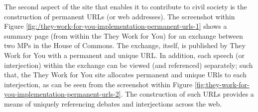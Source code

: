 The second aspect of the site that enables it to contribute to civil society is the construction of permanent URLs (or web addresses).
The screenshot within Figure \ref{fig:/they-work-for-you-implementation-permanent-urls-1} shows a summary page (from within the They Work for You) for an exchange between two MPs in the House of Commons. 
The exchange, itself, is published by They Work for You with a permanent and unique URL.
In addition, each speech (or interjection) within the exchange can be viewed (and referenced) separately;
such that, the They Work for You site allocates permanent and unique URls to each interjection, as can be seen from the screenshot within Figure \ref{fig:they-work-for-you-implementation-permanent-urls-2}.
The construction of such URLs provides a means of uniquely referencing debates and interjections across the web.